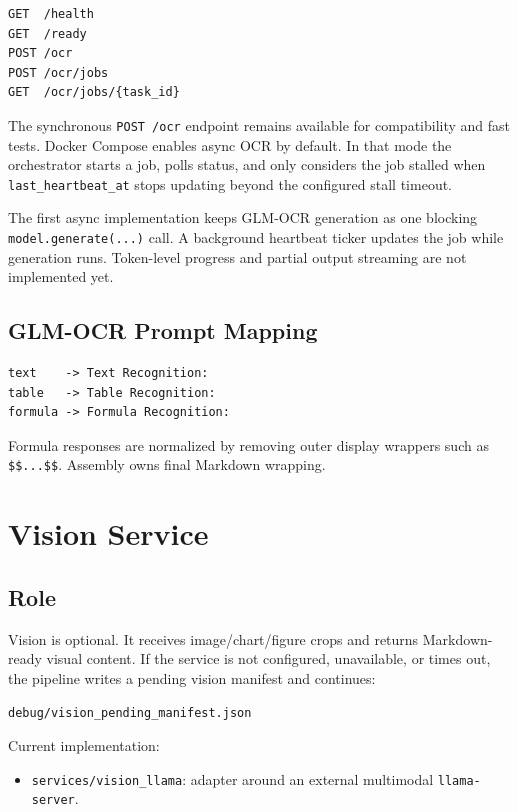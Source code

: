 \documentclass[11pt,a4paper]{article}
\begin{document}
\begin{lstlisting}
GET  /health
GET  /ready
POST /ocr
POST /ocr/jobs
GET  /ocr/jobs/{task_id}
\end{lstlisting}

The synchronous \texttt{POST /ocr} endpoint remains available for compatibility
and fast tests. Docker Compose enables async OCR by default. In that mode the
orchestrator starts a job, polls status, and only considers the job stalled when
\texttt{last\_heartbeat\_at} stops updating beyond the configured stall
timeout.

The first async implementation keeps GLM-OCR generation as one blocking
\texttt{model.generate(...)} call. A background heartbeat ticker updates the
job while generation runs. Token-level progress and partial output streaming
are not implemented yet.

\subsection{GLM-OCR Prompt Mapping}

\begin{lstlisting}
text    -> Text Recognition:
table   -> Table Recognition:
formula -> Formula Recognition:
\end{lstlisting}

Formula responses are normalized by removing outer display wrappers such as
\texttt{\$\$...\$\$}. Assembly owns final Markdown wrapping.

\section{Vision Service}

\subsection{Role}

Vision is optional. It receives image/chart/figure crops and returns
Markdown-ready visual content. If the service is not configured, unavailable,
or times out, the pipeline writes a pending vision manifest and continues:

\begin{lstlisting}
debug/vision_pending_manifest.json
\end{lstlisting}

Current implementation:

\begin{itemize}[leftmargin=1.2cm]
\item \texttt{services/vision\_llama}: adapter around an external multimodal
  \texttt{llama-server}.
\end{itemize}
\end{document}
